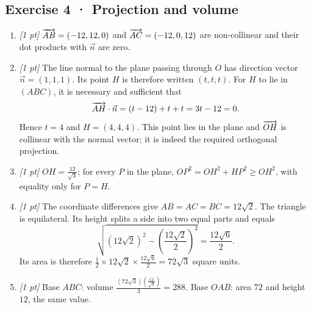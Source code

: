 \subsection*{Exercise 4 · Projection and volume}\begin{enumerate}

\item \textit{[1 pt]} $\overrightarrow{AB}=(-12,12,0)$ and $\overrightarrow{AC}=(-12,0,12)$ are non-collinear and their dot products with $\vec n$ are zero.

\item \textit{[1 pt]} The line normal to the plane passing through $O$ has direction vector $\vec n=(1,1,1)$. Its point $H$ is therefore written $(t,t,t)$. For $H$ to lie in $(ABC)$, it is necessary and sufficient that
\[\overrightarrow{AH}\cdot\vec n=(t-12)+t+t=3t-12=0.\]
Hence $t=4$ and $H=(4,4,4)$. This point lies in the plane and $\overrightarrow{OH}$ is collinear with the normal vector; it is indeed the required orthogonal projection.

\item \textit{[1 pt]} $OH=\frac{12}{\sqrt{3}}$; for every $P$ in the plane, $OP^2=OH^2+HP^2\ge OH^2$, with equality only for $P=H$.

\item \textit{[1 pt]} The coordinate differences give $AB=AC=BC=12\sqrt2$. The triangle is equilateral. Its height splits a side into two equal parts and equals
\[\sqrt{(12\sqrt2)^2-(\frac{12\sqrt{2}}{2})^2}=\frac{12\sqrt6}{2}.\]
Its area is therefore $\frac12\times 12\sqrt2\times\frac{12\sqrt6}{2}=72\sqrt3$ square units.

\item \textit{[1 pt]} Base $ABC$: volume $\frac{(72\sqrt3)(\frac{12}{\sqrt{3}})}{3}=288$. Base $OAB$: area $72$ and height $12$, the same value.

\end{enumerate}

\fi

\fi

